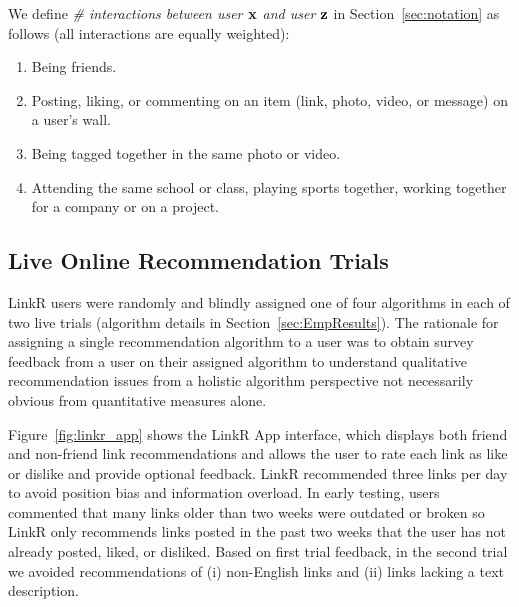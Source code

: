 We define \emph{\# interactions between user $\mathbf{x}$ and user $\mathbf{z}$} in 
Section~\ref{sec:notation} as follows (all interactions are equally weighted):
\begin{enumerate}
\item{Being friends.}
\item{Posting, liking, or commenting on an item (link, photo, video, or message) on a user's wall.}
\item{Being tagged together in the same photo or video.}
\item{Attending the same school or class, playing sports together, working together for a company or on a project.}
\end{enumerate}

\subsection{Live Online Recommendation Trials}

LinkR users were randomly and blindly assigned one of four algorithms
in each of two live trials (algorithm details in
Section~\ref{sec:EmpResults}).  The rationale for assigning
a single recommendation algorithm to a user was to obtain survey
feedback from a user on their assigned algorithm to understand
qualitative recommendation issues from a holistic algorithm
perspective not necessarily obvious from quantitative measures alone.

Figure~\ref{fig:linkr_app} shows the LinkR App interface, which
displays both friend and non-friend link recommendations and allows
the user to rate each link as like or dislike and provide optional
feedback.  LinkR recommended three links per day to 
avoid position bias and information overload.  In early testing, users 
commented that many links older than two weeks were outdated or
broken so LinkR only recommends links posted in the past two
weeks that the user has not already posted, liked, or disliked.  Based
on first trial feedback, in the second trial we avoided
recommendations of (i) non-English links and (ii) links lacking a text
description.

 